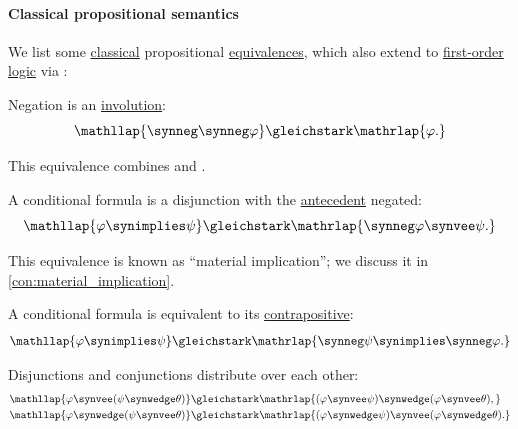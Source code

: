 \paragraph{Classical propositional semantics}

\begin{proposition}\label{thm:classical_equivalences}
  We list some \hyperref[def:truth_value_algebra/classical]{classical} propositional \hyperref[def:semantic_equivalence]{equivalences}, which also extend to \hyperref[def:first_order_logic]{first-order logic} via :
  \begin{thmenum}
     Negation is an \hyperref[def:categorical_involution]{involution}:
    \begin{equation}\label{eq:thm:classical_equivalences/double_negation}
      \mathllap{\synneg \synneg \varphi} \gleichstark \mathrlap{\varphi.}
    \end{equation}

    This equivalence combines  and .

     A conditional formula is a disjunction with the \hyperref[def:conditional_formula/antecedent]{antecedent} negated:
    \begin{equation}\label{eq:thm:classical_equivalences/conditional_as_disjunction}
      \mathllap{\varphi \synimplies \psi} \gleichstark \mathrlap{ \synneg \varphi \synvee \psi. }
    \end{equation}

    This equivalence is known as \enquote{material implication}; we discuss it in \cref{con:material_implication}.

     A conditional formula is equivalent to its \hyperref[def:conditional_formula/contrapositive]{contrapositive}:
    \begin{equation}\label{eq:thm:classical_equivalences/contrapositive}
      \mathllap{\varphi \synimplies \psi} \gleichstark \mathrlap{\synneg \psi \synimplies \synneg \varphi.}
    \end{equation}

     Disjunctions and conjunctions distribute over each other:
    \begin{align}
      \mathllap{\varphi \synvee (\psi \synwedge \theta)} &\gleichstark \mathrlap{(\varphi \synvee \psi) \synwedge (\varphi \synvee \theta),}   \label{eq:thm:classical_equivalences/distributivity/join_over_meet} \\
      \mathllap{\varphi \synwedge (\psi \synvee \theta)} &\gleichstark \mathrlap{(\varphi \synwedge \psi) \synvee (\varphi \synwedge \theta).} \label{eq:thm:classical_equivalences/distributivity/meet_over_join}
    \end{align}


\end{thmenum}
\end{proposition}
